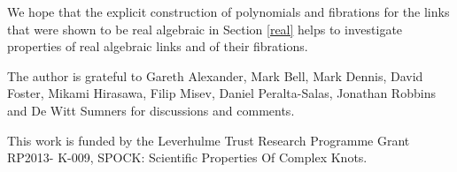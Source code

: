 \documentclass[notitlepage,12pt]{revtex4-1}
\begin{document}
We hope that the explicit construction of polynomials and fibrations for the links that were shown to be real algebraic in Section \ref{real} helps to investigate properties of real algebraic links and of their fibrations.

 

 

\begin{acknowledgements}
The author is grateful to Gareth Alexander, Mark Bell, Mark Dennis, David Foster, Mikami Hirasawa, Filip Misev, Daniel Peralta-Salas, Jonathan Robbins and De Witt Sumners for discussions and comments.

This work is funded by the Leverhulme Trust Research Programme Grant RP2013- K-009, SPOCK: Scientific Properties Of Complex Knots.
\end{acknowledgements}
\end{document}
